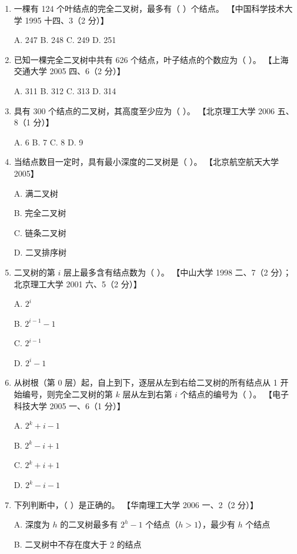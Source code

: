 \documentclass[lang=cn,newtx,10pt,scheme=chinese]{../../elegantbook}
\begin{document}
\begin{enumerate}
    \item 一棵有 124 个叶结点的完全二叉树，最多有（ ）个结点。  
    【中国科学技术大学 1995 十四、3（2 分）】  

    A. 247 \quad B. 248 \quad C. 249 \quad D. 251  

    \item 已知一棵完全二叉树中共有 626 个结点，叶子结点的个数应为（ ）。  
    【上海交通大学 2005 四、6（2 分）】  

    A. 311 \quad B. 312 \quad C. 313 \quad D. 314  

    \item 具有 300 个结点的二叉树，其高度至少应为（ ）。  
    【北京理工大学 2006 五、8（1 分）】  

    A. 6 \quad B. 7 \quad C. 8 \quad D. 9  

    \item 当结点数目一定时，具有最小深度的二叉树是（ ）。  
    【北京航空航天大学 2005】  

    A. 满二叉树  

    B. 完全二叉树  

    C. 链条二叉树  

    D. 二叉排序树  

    \item 二叉树的第 $i$ 层上最多含有结点数为（ ）。  
    【中山大学 1998 二、7（2 分）；北京理工大学 2001 六、5（2 分）】  

    A. $2^i$  


    B. $2^{i-1} - 1$  

    C. $2^{i-1}$  

    D. $2^{i} - 1$  

    \item 从树根（第 0 层）起，自上到下，逐层从左到右给二叉树的所有结点从 1 开始编号，则完全二叉树的第 $k$ 层从左到右第 $i$ 个结点的编号为（ ）。  
    【电子科技大学 2005 一、6（1 分）】  

    A. $2^k + i - 1$  

    B. $2^{k} - i + 1$  

    C. $2^k + i + 1$  

    D. $2^{k} - i - 1$  

    \item 下列判断中，（ ）是正确的。  
    【华南理工大学 2006 一、2（2 分）】  

    A. 深度为 $h$ 的二叉树最多有 $2^h - 1$ 个结点（$h > 1$），最少有 $h$ 个结点  

    B. 二叉树中不存在度大于 2 的结点  


\end{enumerate}
\end{document}
